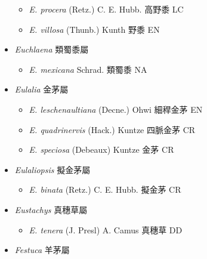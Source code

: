 \begin{itemize}
  \begin{itemize}
        \item[] \textit{E. procera} (Retz.) C. E. Hubb.  高野黍   LC
        \item[] \textit{E. villosa} (Thunb.) Kunth  野黍   EN
  \end{itemize}
 \item[] \textit{Euchlaena} 類蜀黍屬
                                
  \begin{itemize}
        \item[] \textit{E. mexicana} Schrad.  類蜀黍   NA
  \end{itemize}
 \item[] \textit{Eulalia} 金茅屬
                                
  \begin{itemize}
        \item[] \textit{E. leschenaultiana} (Decne.) Ohwi  細稈金茅   EN
        \item[] \textit{E. quadrinervis} (Hack.) Kuntze  四脈金茅   CR
        \item[] \textit{E. speciosa} (Debeaux) Kuntze  金茅   CR
  \end{itemize}
 \item[] \textit{Eulaliopsis} 擬金茅屬
                                
  \begin{itemize}
        \item[] \textit{E. binata} (Retz.) C. E. Hubb.  擬金茅   CR
  \end{itemize}
 \item[] \textit{Eustachys} 真穗草屬
                                
  \begin{itemize}
        \item[] \textit{E. tenera} (J. Presl) A. Camus  真穗草   DD
  \end{itemize}
 \item[] \textit{Festuca} 羊茅屬
                                

\end{itemize}
